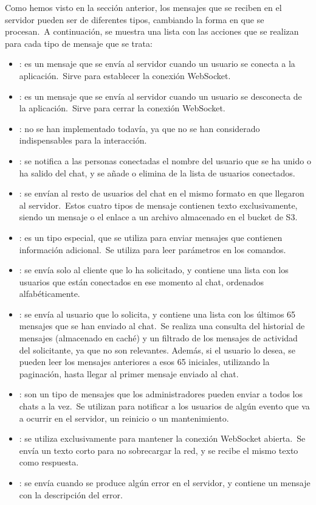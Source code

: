 
Como hemos visto en la sección anterior, los mensajes que se reciben en el servidor pueden ser de diferentes tipos,
cambiando la forma en que se procesan.\ A continuación, se muestra una lista con las acciones que se realizan para
cada tipo de mensaje que se trata:

\begin{itemize}
	\item {}: es un mensaje que se envía al servidor cuando un usuario se conecta a la
	aplicación.\ Sirve para establecer la conexión WebSocket.
	\item {}: es un mensaje que se envía al servidor cuando un usuario se desconecta de la
	aplicación.\ Sirve para cerrar la conexión WebSocket.
	\item {}: no se han implementado todavía, ya que no se han considerado
	indispensables para la interacción.
	\item {}: se notifica a las personas conectadas el nombre del usuario que se ha
	unido o ha
	salido del chat, y se añade o elimina de la lista de usuarios conectados.
	\item {}: se envían al resto de usuarios del chat en el mismo
	formato en que llegaron al
	servidor.\ Estos cuatro tipos de mensaje contienen texto exclusivamente, siendo un mensaje o el enlace a un
	archivo almacenado en el bucket de S3.
	\item {}: es un tipo especial, que se utiliza para enviar mensajes que contienen información
	adicional.\ Se utiliza para leer parámetros en los comandos.
	\item {}: se envía solo al cliente que lo ha solicitado, y contiene una lista con los usuarios
	que están conectados en ese momento al chat, ordenados alfabéticamente.
	\item {}: se envía al usuario que lo solicita, y contiene una lista con los últimos 65 mensajes
	que se han enviado al chat.\ Se realiza una consulta del historial de mensajes (almacenado en caché)
	y un filtrado de los mensajes de actividad del solicitante, ya que no son relevantes.
	Además, si el usuario lo desea, se pueden leer los mensajes anteriores a esos 65 iniciales, utilizando
	la paginación, hasta llegar al primer mensaje enviado al chat.
	\item {}: son un tipo de mensajes que los administradores pueden enviar a todos
	los chats a la vez.\ Se utilizan para notificar a los usuarios de algún evento que va a ocurrir en el servidor,
	un reinicio o un mantenimiento.
	\item {}: se utiliza exclusivamente para mantener la conexión WebSocket abierta.\ Se envía un texto
	corto para no sobrecargar la red, y se recibe el mismo texto como respuesta.
	\item {}: se envía cuando se produce algún error en el servidor, y contiene un mensaje con la
	descripción del error.
\end{itemize}
